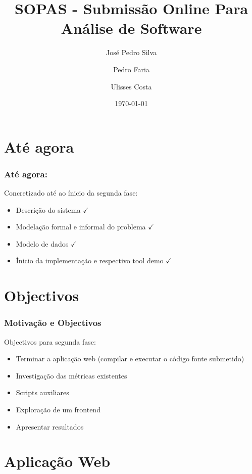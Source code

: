 \documentclass{beamer}
\title{SOPAS - Submissão Online Para Análise de Software}
\author{José Pedro Silva \and
Pedro Faria \and
Ulisses Costa
}
\date{\today}
\institute{Engenharia de Linguagens\\
Projecto integrado
}
\begin{document}
\begin{frame}
   \titlepage
\end{frame}

\section{Até agora}
\begin{frame} \frametitle{Até agora:}
Concretizado até ao ínicio da segunda fase:
\begin{itemize}
\item Descrição do sistema {\color{green}$\checkmark$}
\item Modelação formal e informal do problema {\color{green}$\checkmark$}
\item Modelo de dados {\color{green}$\checkmark$}
\item Ínicio da implementação e respectivo tool demo {\color{green}$\checkmark$}
\end{itemize}
\end{frame}

\section{Objectivos}

\begin{frame} \frametitle{Motivação e Objectivos}
Objectivos para segunda fase:
\begin{itemize}
\item Terminar a aplicação web (compilar e executar o código fonte submetido)
\item Investigação das métricas existentes
\item Scripts auxiliares
\item Exploração de um frontend
\item Apresentar resultados
\end{itemize}
\end{frame}

\section{Aplicação Web}
\end{document}
